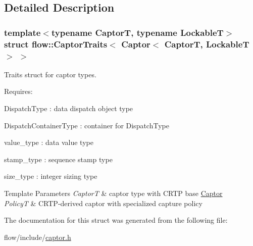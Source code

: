 \subsection{Detailed Description}
\subsubsection*{template$<$typename CaptorT, typename LockableT$>$\newline
struct flow\+::\+Captor\+Traits$<$ Captor$<$ Captor\+T, Lockable\+T $>$ $>$}

Traits struct for captor types. 

Requires\+:
\begin{DoxyItemize}
\item {\ttfamily Dispatch\+Type} \+: data dispatch object type
\item {\ttfamily Dispatch\+Container\+Type} \+: container for {\ttfamily Dispatch\+Type}
\item {\ttfamily value\+\_\+type} \+: data value type
\item {\ttfamily stamp\+\_\+type} \+: sequence stamp type
\item {\ttfamily size\+\_\+type} \+: integer sizing type
\end{DoxyItemize}


\begin{DoxyTemplParams}{Template Parameters}
{\em CaptorT} & captor type with C\+R\+TP base {\ttfamily \hyperlink{classflow_1_1_captor}{Captor}}\\
\hline
{\em PolicyT} & C\+R\+T\+P-\/derived captor with specialized capture policy \\
\hline
\end{DoxyTemplParams}


The documentation for this struct was generated from the following file\+:\begin{DoxyCompactItemize}
\item 
flow/include/\hyperlink{captor_8h}{captor.\+h}\end{DoxyCompactItemize}
